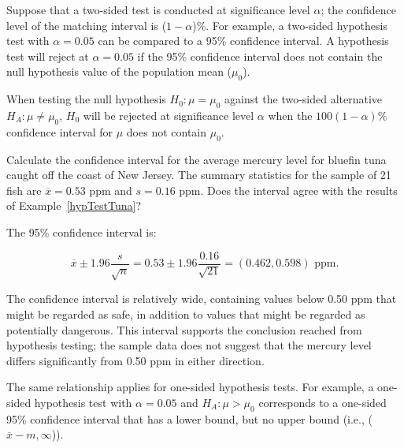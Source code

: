 Suppose that a two-sided test is conducted at significance level $\alpha$; the confidence level of the matching interval is ($1 - \alpha$)\%. For example, a two-sided hypothesis test with $\alpha = 0.05$ can be compared to a 95\% confidence interval. A hypothesis test will reject at $\alpha = 0.05$ if the 95\% confidence interval does not contain the null hypothesis value of the population mean ($\mu_0$).

\begin{termBox}{
{When testing the null hypothesis $H_0:\mu = \mu_0$ against the two-sided alternative $H_A: \mu \neq \mu_0$, $H_0$ will be rejected at significance level $\alpha$ when the $100(1-\alpha)\%$ confidence interval for $\mu$ does not contain $\mu_0$. }}
\end{termBox}

\begin{example}
{Calculate the confidence interval for the average mercury level for bluefin tuna caught off the coast of New Jersey. The summary statistics for the sample of 21 fish are $\overline{x} = 0.53$ ppm and $s = 0.16$ ppm. Does the interval agree with the results of Example~\ref{hypTestTuna}?}

The 95\% confidence interval is: 

\[\overline{x} \pm 1.96 \dfrac{s}{\sqrt{n}}= 0.53 \pm 1.96 \frac{0.16}{\sqrt{21}} = (0.462, 0.598) \text{ ppm}.\]

The confidence interval is relatively wide, containing values below 0.50 ppm that might be regarded as safe, in addition to values that might be regarded as potentially dangerous. This interval supports the conclusion reached from hypothesis testing; the sample data does not suggest that the mercury level differs significantly from 0.50 ppm in either direction. 

\end{example}
	
The same relationship applies for one-sided hypothesis tests. For example, a one-sided hypothesis test with $\alpha = 0.05$ and $H_A: \mu > \mu_0$ corresponds to a one-sided 95\% confidence interval that has a lower bound, but no upper bound (i.e., ($\overline{x} - m, \infty$)).
	
